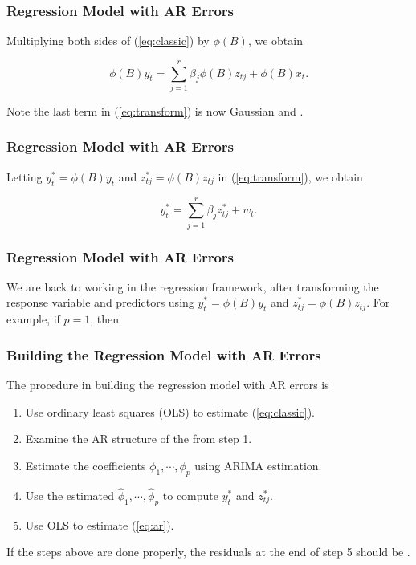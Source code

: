 \documentclass[%
xcolor=pdftex]{beamer}
\begin{document}
\begin{frame}
\frametitle{Regression Model with AR Errors}

Multiplying both sides of (\ref{eq:classic}) by $\phi(B)$, we obtain

\begin{equation} \label{eq:transform}
\phi(B) y_t = \sum_{j=1}^r \beta_j \phi(B) z_{tj} + \phi(B)x_t.
\end{equation}

Note the last term in (\ref{eq:transform}) is now Gaussian and \underline{\hspace{25 mm}} \underline{\hspace{10 mm}}. 

\end{frame}

\begin{frame}
\frametitle{Regression Model with AR Errors}

Letting $y_t^* = \phi(B) y_t$ and $z_{tj}^* = \phi(B) z_{tj}$ in (\ref{eq:transform}), we obtain

\begin{equation} \label{eq:ar}
y_t^* = \sum_{j=1}^r \beta_j z_{tj}^* + w_t.
\end{equation}

\end{frame}

\begin{frame}
\frametitle{Regression Model with AR Errors}

We are back to working in the regression framework, after transforming the response variable and predictors using $y_t^* = \phi(B) y_t$ and $z_{tj}^* = \phi(B) z_{tj}$. For example, if $p=1$, then

\vspace{40mm}

\end{frame}





\begin{frame}
\frametitle{Building the Regression Model with AR Errors}

The procedure in building the regression model with AR errors is

\begin{enumerate}
\item Use ordinary least squares (OLS) to estimate (\ref{eq:classic}).
\item Examine the AR structure of the \underline{\hspace{30 mm}} from step 1.
\item Estimate the coefficients $\phi_1, \cdots, \phi_p$ using ARIMA estimation.
\item Use the estimated $\hat{\phi}_1, \cdots, \hat{\phi}_p$ to compute $y_t^*$ and $z_{tj}^*$.
\item Use OLS to estimate (\ref{eq:ar}).
\end{enumerate}

If the steps above are done properly, the residuals at the end of step 5 should be \underline{\hspace{20 mm}}.

\end{frame}
\end{document}
